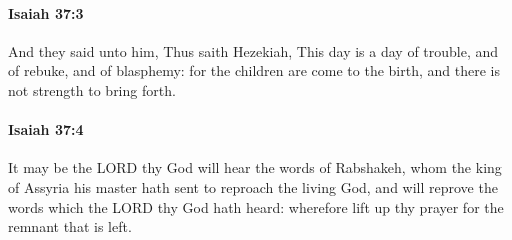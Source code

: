 		\paragraph{Isaiah 37:3} %
			\label{ISAIAH-37-3}

			And they said unto him, Thus saith Hezekiah, This day is a day of trouble, and of rebuke, and of blasphemy: for the children are come to the birth, and there is not strength to bring forth.


		\paragraph{Isaiah 37:4} %
			\label{ISAIAH-37-4}

			It may be the LORD thy God will hear the words of Rabshakeh, whom the king of Assyria his master hath sent to reproach the living God, and will reprove the words which the LORD thy God hath heard: wherefore lift up thy prayer for the remnant that is left.

